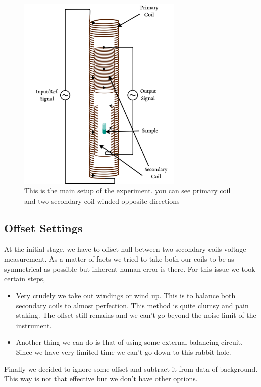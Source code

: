 \begin{figure}[h]
  \centering\includegraphics[width=0.7\textwidth]{coils.png}
  \caption{This is the main setup of the experiment. you can see primary coil and two secondary coil winded opposite directions}
  \label{fig:assembly}
\end{figure}



\subsection{Offset Settings}

At the initial stage, we have to offset null between two secondary coils voltage measurement. As a matter of facts we tried to take both our coils to be as symmetrical as possible but inherent human error is there. For this issue we took certain steps,

  
\begin{itemize}
\item Very crudely we take out windings or wind up. This is to balance both secondary coils to almost perfection. This method is quite clumsy and pain staking. The offset still remains and we can’t go beyond the noise limit of the instrument.
\vskip1cm
\item Another thing we can do is that of using some external balancing circuit. Since we have very limited time we can’t go down to this rabbit hole.
\end{itemize}
\vskip1cm
Finally we decided to ignore some offset and subtract it from data of background. This way is not that effective but we don’t have other options.


